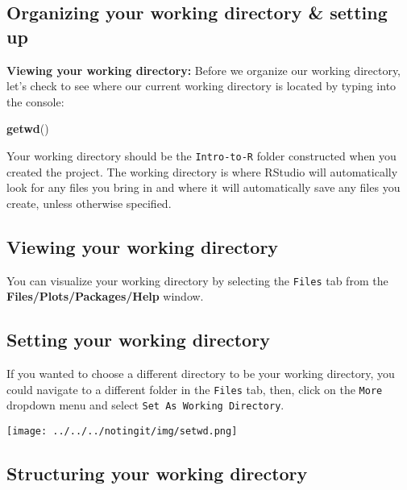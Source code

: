 \documentclass[
]{article}
\newenvironment{Shaded}{\begin{snugshade}}{\end{snugshade}}
\newcommand{\KeywordTok}[1]{\textcolor[rgb]{0.13,0.29,0.53}{\textbf{#1}}}
\newcommand{\NormalTok}[1]{#1}
\begin{document}
\hypertarget{organizing-your-working-directory-setting-up}{%
\subsection{Organizing your working directory \& setting
up}\label{organizing-your-working-directory-setting-up}}

\textbf{Viewing your working directory:} Before we organize our working
directory, let's check to see where our current working directory is
located by typing into the console:

\begin{Shaded}
\begin{Highlighting}[]
\KeywordTok{getwd}\NormalTok{()}
\end{Highlighting}
\end{Shaded}

Your working directory should be the \texttt{Intro-to-R} folder
constructed when you created the project. The working directory is where
RStudio will automatically look for any files you bring in and where it
will automatically save any files you create, unless otherwise
specified.

\hypertarget{viewing-your-working-directory}{%
\subsection{Viewing your working
directory}\label{viewing-your-working-directory}}

You can visualize your working directory by selecting the \texttt{Files}
tab from the \textbf{Files/Plots/Packages/Help} window.

\hypertarget{setting-your-working-directory}{%
\subsection{Setting your working
directory}\label{setting-your-working-directory}}

If you wanted to choose a different directory to be your working
directory, you could navigate to a different folder in the
\texttt{Files} tab, then, click on the \texttt{More} dropdown menu and
select \texttt{Set\ As\ Working\ Directory}.

\texttt{[image: ../../../notingit/img/setwd.png]}

\hypertarget{structuring-your-working-directory}{%
\subsection{Structuring your working
directory}\label{structuring-your-working-directory}}
\end{document}
